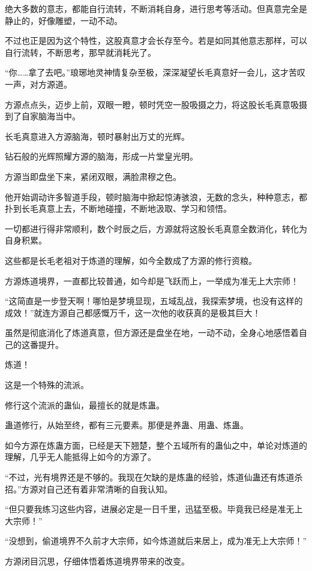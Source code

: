 \begin{this_body}
绝大多数的意志，都能自行流转，不断消耗自身，进行思考等活动。但真意完全是静止的，好像雕塑，一动不动。

不过也正是因为这个特性，这股真意才会长存至今。若是如同其他意志那样，可以自行流转，不断思考，那早就消耗光了。

“你……拿了去吧。”琅琊地灵神情复杂至极，深深凝望长毛真意好一会儿，这才苦叹一声，对方源道。

方源点点头，迈步上前，双眼一瞪，顿时凭空一股吸摄之力，将这股长毛真意吸摄到了自家脑海当中。

长毛真意进入方源脑海，顿时暴射出万丈的光辉。

钻石般的光辉照耀方源的脑海，形成一片堂皇光明。

方源当即盘坐下来，紧闭双眼，满脸肃穆之色。

他开始调动许多智道手段，顿时脑海中掀起惊涛骇浪，无数的念头，种种意志，都扑到长毛真意上去，不断地碰撞，不断地汲取、学习和领悟。

一切都进行得非常顺利，数个时辰之后，方源就将这股长毛真意全数消化，转化为自身积累。

这些都是长毛老祖对于炼道的理解，如今全数成了方源的修行资粮。

方源炼道境界，一直都比较普通，如今却是飞跃而上，一举成为准无上大宗师！

“这简直是一步登天啊！哪怕是梦境显现，五域乱战，我探索梦境，也没有这样的成效！”就连方源自己都感慨万千，这一次他的收获真的是极其巨大！

虽然是彻底消化了炼道真意，但方源还是盘坐在地，一动不动，全身心地感悟着自己的这番提升。

炼道！

这是一个特殊的流派。

修行这个流派的蛊仙，最擅长的就是炼蛊。

蛊道修行，从始至终，都有三元要素。那便是养蛊、用蛊、炼蛊。

如今方源在炼蛊方面，已经是天下翘楚，整个五域所有的蛊仙之中，单论对炼道的理解，几乎无人能抵得上如今的方源了。

“不过，光有境界还是不够的。我现在欠缺的是炼蛊的经验，炼道仙蛊还有炼道杀招。”方源对自己还有着非常清晰的自我认知。

“但只要我练习这些内容，进展必定是一日千里，迅猛至极。毕竟我已经是准无上大宗师！”

“没想到，偷道境界不久前才大宗师，如今炼道就后来居上，成为准无上大宗师！”

方源闭目沉思，仔细体悟着炼道境界带来的改变。


\end{this_body}
